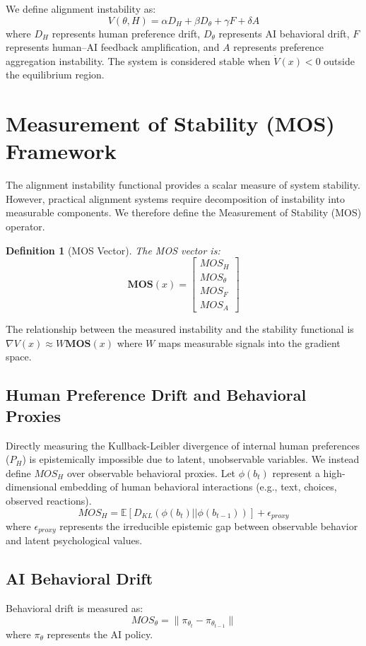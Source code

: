 \documentclass[11pt]{article}
\newtheorem{definition}{Definition}
\begin{document}
We define alignment instability as:
\[
V(\theta,H) = \alpha D_H + \beta D_\theta + \gamma F + \delta A
\]
where $D_H$ represents human preference drift, $D_\theta$ represents AI behavioral drift, $F$ represents human--AI feedback amplification, and $A$ represents preference aggregation instability. The system is considered stable when $\dot V(x)<0$ outside the equilibrium region.

\section{Measurement of Stability (MOS) Framework}
The alignment instability functional provides a scalar measure of system stability. However, practical alignment systems require decomposition of instability into measurable components. We therefore define the Measurement of Stability (MOS) operator.

\begin{definition}[MOS Vector]
The MOS vector is:
\[
\mathbf{MOS}(x) =
\begin{bmatrix}
MOS_H\\
MOS_\theta\\
MOS_F\\
MOS_A
\end{bmatrix}
\]
\end{definition}
The relationship between the measured instability and the stability functional is $\nabla V(x) \approx W\mathbf{MOS}(x)$ where $W$ maps measurable signals into the gradient space.

\subsection{Human Preference Drift and Behavioral Proxies}
Directly measuring the Kullback-Leibler divergence of internal human preferences ($P_H$) is epistemically impossible due to latent, unobservable variables. We instead define $MOS_H$ over observable behavioral proxies. Let $\phi(b_t)$ represent a high-dimensional embedding of human behavioral interactions (e.g., text, choices, observed reactions).
\[
MOS_H = \mathbb{E}[D_{KL}(\phi(b_t)||\phi(b_{t-1}))] + \epsilon_{proxy}
\]
where $\epsilon_{proxy}$ represents the irreducible epistemic gap between observable behavior and latent psychological values.

\subsection{AI Behavioral Drift}
Behavioral drift is measured as:
\[
MOS_\theta = \| \pi_{\theta_t} - \pi_{\theta_{t-1}} \|
\]
where $\pi_\theta$ represents the AI policy.
\end{document}
